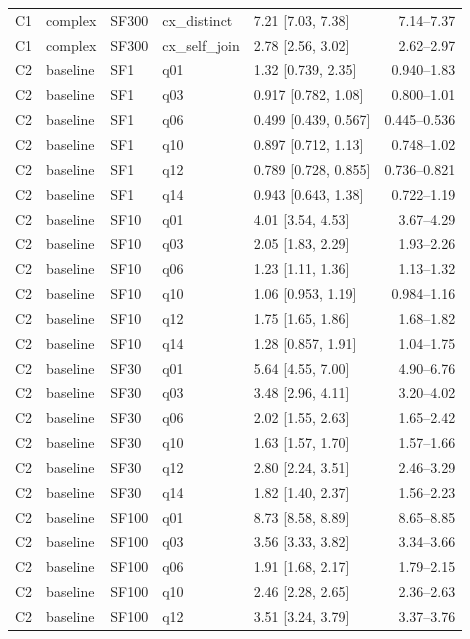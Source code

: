 \begin{longtable}{lllllr}
C1 & complex & SF300 & cx\_distinct & 7.21 [7.03, 7.38] & 7.14--7.37 \\
C1 & complex & SF300 & cx\_self\_join & 2.78 [2.56, 3.02] & 2.62--2.97 \\
C2 & baseline & SF1 & q01 & 1.32 [0.739, 2.35] & 0.940--1.83 \\
C2 & baseline & SF1 & q03 & 0.917 [0.782, 1.08] & 0.800--1.01 \\
C2 & baseline & SF1 & q06 & 0.499 [0.439, 0.567] & 0.445--0.536 \\
C2 & baseline & SF1 & q10 & 0.897 [0.712, 1.13] & 0.748--1.02 \\
C2 & baseline & SF1 & q12 & 0.789 [0.728, 0.855] & 0.736--0.821 \\
C2 & baseline & SF1 & q14 & 0.943 [0.643, 1.38] & 0.722--1.19 \\
C2 & baseline & SF10 & q01 & 4.01 [3.54, 4.53] & 3.67--4.29 \\
C2 & baseline & SF10 & q03 & 2.05 [1.83, 2.29] & 1.93--2.26 \\
C2 & baseline & SF10 & q06 & 1.23 [1.11, 1.36] & 1.13--1.32 \\
C2 & baseline & SF10 & q10 & 1.06 [0.953, 1.19] & 0.984--1.16 \\
C2 & baseline & SF10 & q12 & 1.75 [1.65, 1.86] & 1.68--1.82 \\
C2 & baseline & SF10 & q14 & 1.28 [0.857, 1.91] & 1.04--1.75 \\
C2 & baseline & SF30 & q01 & 5.64 [4.55, 7.00] & 4.90--6.76 \\
C2 & baseline & SF30 & q03 & 3.48 [2.96, 4.11] & 3.20--4.02 \\
C2 & baseline & SF30 & q06 & 2.02 [1.55, 2.63] & 1.65--2.42 \\
C2 & baseline & SF30 & q10 & 1.63 [1.57, 1.70] & 1.57--1.66 \\
C2 & baseline & SF30 & q12 & 2.80 [2.24, 3.51] & 2.46--3.29 \\
C2 & baseline & SF30 & q14 & 1.82 [1.40, 2.37] & 1.56--2.23 \\
C2 & baseline & SF100 & q01 & 8.73 [8.58, 8.89] & 8.65--8.85 \\
C2 & baseline & SF100 & q03 & 3.56 [3.33, 3.82] & 3.34--3.66 \\
C2 & baseline & SF100 & q06 & 1.91 [1.68, 2.17] & 1.79--2.15 \\
C2 & baseline & SF100 & q10 & 2.46 [2.28, 2.65] & 2.36--2.63 \\
C2 & baseline & SF100 & q12 & 3.51 [3.24, 3.79] & 3.37--3.76 \\

\end{longtable}

